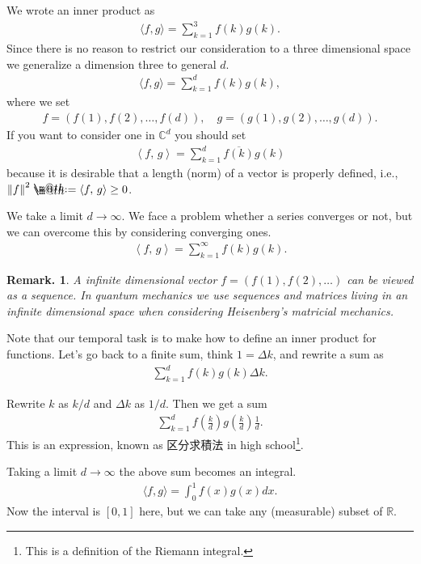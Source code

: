 \documentclass[openany, a4paper, oneside]{book}
\makeatletter
\newcommand*{\defeq}{\mathrel{\rlap{%
\raisebox{0.3ex}{$\m@th\cdot$}}%
\raisebox{-0.3ex}{$\m@th\cdot$}}%
=}
\theoremstyle{break}
\theoremstyle{breakdefn}
\newtheorem{rem}[thm]{Remark.}
\newcommand{\norm}[1]{\left\Vert#1\right\Vert}
\newcommand{\rbk}[1]{\left (#1\right)}
\newcommand{\bkt}[2]{\left\langle#1,\,#2\right\rangle}
\newcommand{\bbC}{\mathbb{C}}
\newcommand{\bbR}{\mathbb{R}}
\makeatother
\begin{document}
We wrote an inner product as
\begin{align}
 \langle f , g \rangle
 =
 \sum_{k=1}^3 f(k)g(k).
\end{align}
Since there is no reason to restrict our consideration to a three dimensional space
we generalize a dimension three to general $d$.
\begin{align}
 \langle f , g \rangle
 =
 \sum_{k=1}^d f(k)g(k),
\end{align}
where we set
\begin{align}
 f = \rbk{f(1), f(2), \dots, f(d)}, \quad
 g = \rbk{g(1), g(2), \dots, g(d)}.
\end{align}
If you want to consider one in $\bbC^d$ you should set
\begin{align}
 \bkt{f}{g}
 =
 \sum_{k=1}^d \overline{f(k)} g(k)
\end{align}
because it is desirable that a length (norm) of a vector is
properly defined, i.e., $\norm{f}^2 \defeq \bkt{f}{g} \geq 0$.

We take a limit $d \to \infty$.
We face a problem whether a series converges or not,
but we can overcome this by considering converging ones.
\begin{align}
 \bkt{f}{g}
 =
 \sum_{k=1}^{\infty} f(k)g(k).
\end{align}

\begin{rem}
 A infinite dimensional vector $f = (f(1), f(2), \dots)$
 can be viewed as a sequence.
 In quantum mechanics we use sequences and matrices living in an infinite dimensional space
 when considering Heisenberg's matricial mechanics.
\end{rem}

Note that our temporal task is to make how to define an inner product for functions.
Let's go back to a finite sum, think $1 = \Delta k$, and rewrite a sum as
\begin{align}
 \sum_{k=1}^{d} f(k)g(k) \Delta k.
\end{align}

Rewrite $k$ as $k/d$ and $\Delta k$ as $1/d$.
Then we get a sum
\begin{align}
 \sum_{k=1}^{d} f \left( \frac{k}{d} \right) g \left( \frac{k}{d} \right) \frac{1}{d}.
\end{align}
This is an expression, known as 区分求積法 in high school\footnote{This is a definition of the Riemann integral.
 }.

Taking a limit $d \to \infty$ the above sum becomes an integral.
\begin{align}
 \langle f, g \rangle
 =
 \int_{0}^{1} f(x) g(x) dx.
\end{align}
Now the interval is $[0, 1]$ here,
but we can take any (measurable) subset of $\bbR$.
\end{document}
